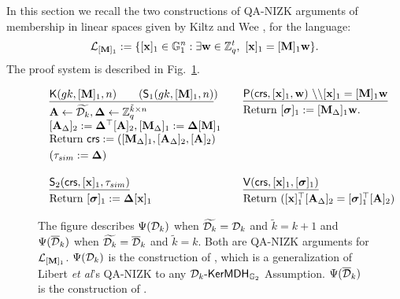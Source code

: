 In this section we recall the two constructions of QA-NIZK arguments of membership in linear spaces given by 
Kiltz and Wee \cite{EC:KilWee15}, for the language:
 $$\mathcal{L}_{[\mathbf{{M}}]_1}:=\{ [\mathbf{x}]_1 \in \mathbb{G}_1^{n}:  \exists \mathbf{w} \in \mathbb{Z}_q^{t}, \  [\mathbf{x}]_1=[\mathbf{{M}}]_1\mathbf{w} \}.$$ 
The proof system is described in Fig.~\ref{fig:QANIZKlinear}. 

\begin{figure} 
$$
\begin{array}{ll}
\begin{array}{l}
\underline{\algK(gk,[\matr{M}]_1,n) \qquad  (\mathsf{S}_1(gk,[\matr{M}]_1,n)})\\[.1cm]

\matr{A} \gets \widetilde{\dist_{k}}, \matr{\Delta} \gets \Z_q^{\tilde{k} \times n}\\
{[\matr{A}_{\Delta}]_2:= \matr{\Delta}^\top[\matr{A}]_2, [\matr{M}_{\Delta}]_1:=\matr{\Delta} [\matr{M}]_1} \\
\text{Return} \ \mathsf{crs}:=([\matr{M}_{\Delta}]_1, [\matr{A}_\Delta]_2, [\matr{A}]_2)\\ [.1cm]
(\tau_{sim}:=\matr{\Delta})
\end{array}
&
\begin{array}{l}
\underline{\algP(\mathsf{crs},[\vecb{x}]_1, \vecb{w}) \  \backslash \backslash [\vecb{x}]_1=[\matr{M}]_1 \vecb{w}} \\[.1cm]

 \text{Return } [\grkb{\sigma}]_1:=[\matr{M}_{\Delta}]_1 \vecb{w}.
\\
\\
\\
\vspace*{.2cm}
\end{array}
\\
\\
\begin{array}{l}
\underline{\mathsf{S}_2(\crs,[\vecb{x}]_1,\tau_{sim})}   \\ [.1cm]
  \text{Return} \ [\grkb{\sigma}]_1:= \matr{\Delta} [\vecb{x}]_1
\end{array}
&
\begin{array}{l}
\underline{\algV(\mathsf{crs},[\vecb{x}]_1,[\grkb{\sigma}]_1)}\\ [.1cm]
\text{Return} \ ([\vecb{x}]_1^\top [\matr{A}_\Delta]_2 = [\grkb{\sigma}]_1^\top[\matr{A}]_2)
\end{array}
\end{array}
$$
\caption{The figure describes $\ps$ when $\widetilde{\dist_{k}}=\dist_k$ and  $\tilde{k}=k+1$ and $\psws$ when $\widetilde{\dist_{k}}=\overline{\dist}_k$ and  $\tilde{k}=k$. Both are QA-NIZK arguments for $\mathcal{L}_{[\matr{M}]_1}$. 
$\ps$  is the construction of \cite[Sect.~3.1]{EC:KilWee15},
  which is a generalization 
of Libert \textit{et al}'s QA-NIZK \cite{EC:LPJY14} to any $\dist_k\mbox{-}\fmdh_{\Hr}$ Assumption. $\psws$ is the construction of  \cite[Sect.\ 3.2.]{EC:KilWee15}%
  .}
\label{fig:QANIZKlinear}
\end{figure}

